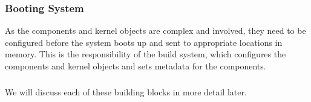 \documentclass[
	a4paper, %
	11pt, %
	unnumberedsections, %
	twoside, %
]{LTJournalArticle}
\begin{document}
\subsubsection{Booting System}
As the components and kernel objects are complex and involved, they need to be configured before the system boots up and sent to appropriate locations in memory. This is the responsibility of the build system, which configures the components and kernel objects and sets metadata for the components.


\subsubsection*{} We will discuss each of these building blocks in more detail later.





\end{document}
